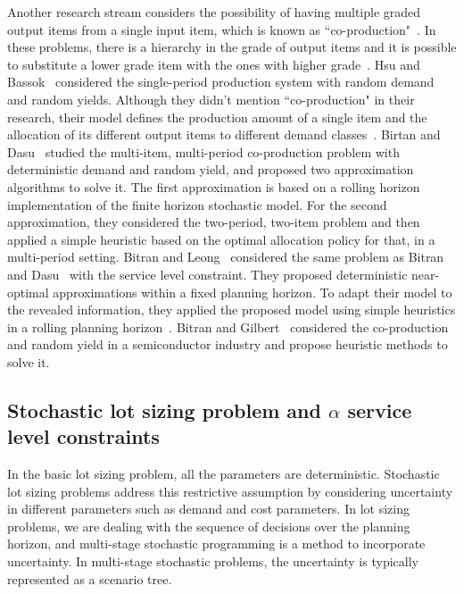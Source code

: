 \documentclass[10pt]{article}
\begin{document}
Another research stream considers the possibility of having multiple graded output items from a single input item, which is known as ``co-production"~\cite{ng2012robust}. In these problems, there is a hierarchy in the grade of output items and it is possible to substitute a lower grade item with the ones with higher grade~\cite{bitran1992ordering}. Hsu and Bassok~\cite{hsu1999random} considered the single-period production system with random demand  and random yields. Although they didn't mention ``co-production" in their research, their model defines the production amount of a single item and the allocation of its different output items to different demand classes~\cite{hsu1999random}.
Birtan and Dasu~\cite{bitran1992ordering} studied the multi-item, multi-period co-production problem with deterministic demand and random yield, and proposed two approximation algorithms to solve it. The first approximation is based on a rolling horizon implementation of the finite horizon stochastic model. For the second approximation, they considered the two-period, two-item problem and then applied a simple heuristic based on the optimal allocation policy for that, in a multi-period setting. Bitran and Leong~\cite{bitran1992deterministic} considered the same problem as Bitran and Dasu~\cite{bitran1992ordering} with the service level constraint. They proposed deterministic near-optimal approximations within a fixed planning horizon. To adapt their model to the revealed information, they applied the proposed model using simple heuristics in a rolling planning horizon~\cite{bitran1992deterministic}.  Bitran and Gilbert~\cite{bitran1994co} considered the co-production and random yield in a semiconductor industry and propose heuristic methods to solve it. 
 

\subsection{Stochastic lot sizing problem and $\alpha$ service level constraints}
In the basic lot sizing problem, all the parameters are deterministic. Stochastic lot sizing problems address this restrictive assumption by considering uncertainty in different parameters such as demand and cost parameters. In lot sizing problems, we are dealing with the sequence of decisions over the planning horizon, and multi-stage stochastic programming is a method to incorporate uncertainty. In multi-stage stochastic problems, the uncertainty is typically represented as a scenario tree. 
\end{document}
